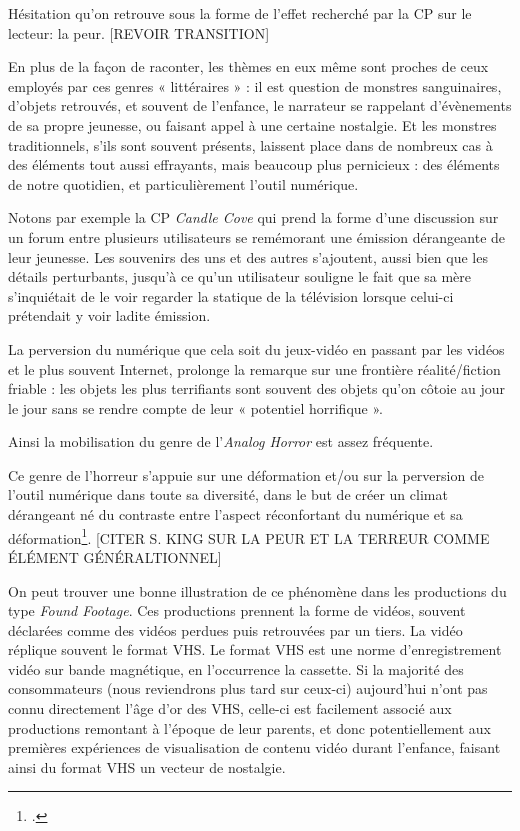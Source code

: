 \documentclass[12pt,a4paper,oneside,titlepage]{book} %
\begin{document}
Hésitation qu'on retrouve sous la forme de l'effet recherché par la CP sur le lecteur: la peur.
[REVOIR TRANSITION]
\par
En plus de la façon de raconter, les thèmes en eux même sont proches de ceux employés par ces genres « littéraires » : il est question de monstres sanguinaires, d’objets retrouvés, et souvent de l’enfance, le narrateur se rappelant d’évènements de sa propre jeunesse, ou faisant appel à une certaine nostalgie. Et les monstres traditionnels, s’ils sont souvent présents, laissent place dans de nombreux cas à des éléments tout aussi effrayants, mais beaucoup plus pernicieux : des éléments de notre quotidien, et particulièrement l’outil numérique. 
\par
Notons par exemple la CP \emph{Candle Cove} qui prend la forme d’une discussion sur un forum entre plusieurs utilisateurs se remémorant une émission dérangeante de leur jeunesse. Les souvenirs des uns et des autres s’ajoutent, aussi bien que les détails perturbants, jusqu’à ce qu’un utilisateur souligne le fait que sa mère s’inquiétait de le voir regarder la statique de la télévision lorsque celui-ci prétendait y voir ladite émission. 
\par
La perversion du numérique que cela soit du jeux-vidéo en passant par les vidéos et le plus souvent Internet, prolonge la remarque sur une frontière réalité/fiction friable : les objets les plus terrifiants sont souvent des objets qu’on côtoie au jour le jour sans se rendre compte de leur « potentiel horrifique ».
\par
Ainsi la mobilisation du genre de l’\emph{Analog Horror }est assez fréquente. 

Ce genre de l’horreur s’appuie sur une déformation et/ou sur la perversion de l’outil numérique dans toute sa diversité, dans le but de créer un climat dérangeant né du contraste entre l’aspect réconfortant du numérique et sa déformation\footcite{balanzategui_creepypasta_2019}. [CITER S. KING SUR LA PEUR ET LA TERREUR COMME ÉLÉMENT GÉNÉRALTIONNEL]
\par
On peut trouver une bonne illustration de ce phénomène dans les productions du type \textit{Found Footage}. Ces productions prennent la forme de vidéos, souvent déclarées comme des vidéos perdues puis retrouvées par un tiers. La vidéo réplique souvent le format VHS. Le format VHS est une norme d'enregistrement vidéo sur bande magnétique, en l'occurrence la cassette. Si la majorité des consommateurs (nous reviendrons plus tard sur ceux-ci) aujourd'hui n'ont pas connu directement l'âge d'or des VHS, celle-ci est facilement associé aux productions remontant à l'époque de leur parents, et donc potentiellement aux premières expériences de visualisation de contenu vidéo durant l'enfance, faisant ainsi du format VHS un vecteur de nostalgie.
\end{document}
